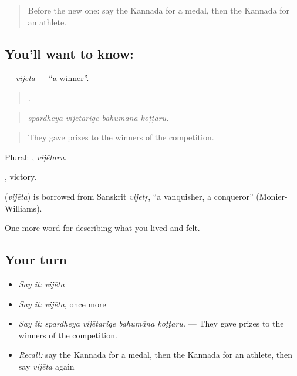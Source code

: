 \label{lesson:KA-C538-vijeta}



\begin{quote}
Before the new one: say the Kannada for a medal, then the Kannada for an athlete.
\end{quote}

\subsection*{You'll want to know: }
\textbf{} — \emph{vijēta} — \textquotedblleft{}a winner\textquotedblright{}.

\begin{quote}
   .
\end{quote}

\begin{quote}
\emph{spardheya vijētarige bahumāna koṭṭaru.}
\end{quote}

\begin{quote}
They gave prizes to the winners of the competition.
\end{quote}

Plural: , \emph{vijētaru}.

, victory.

\begin{cousinweb}
\textbf{} (\emph{vijēta}) is borrowed from Sanskrit \emph{vijetṛ}, \textquotedblleft{}a vanquisher, a conqueror\textquotedblright{} (Monier-Williams).
\end{cousinweb}

\begin{grammarlens}[title={What you've built}]
One more word for describing what you lived and felt.
\end{grammarlens}

\subsection*{Your turn}
\begin{itemize}
\raggedright
  \item \emph{Say it:} \emph{vijēta}
  \item \emph{Say it:} \emph{vijēta}, once more
  \item \emph{Say it:} \emph{spardheya vijētarige bahumāna koṭṭaru.} — They gave prizes to the winners of the competition.
  \item \emph{Recall:} say the Kannada for a medal, then the Kannada for an athlete, then say \emph{vijēta} again
\end{itemize}

